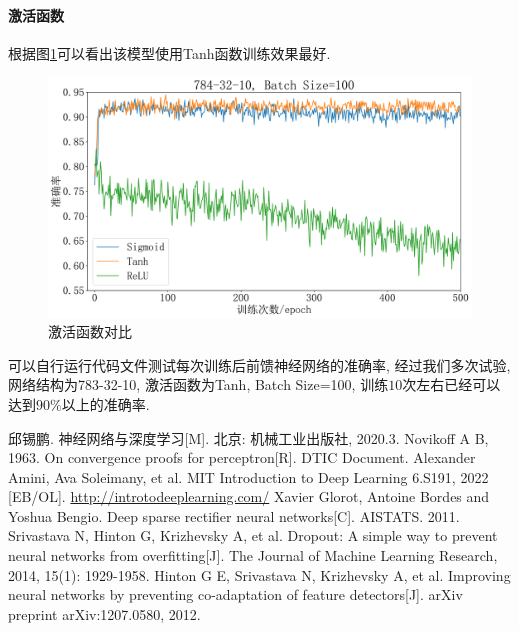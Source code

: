 \documentclass[12pt, a4paper, oneside]{ctexart}
\begin{document}
\paragraph{激活函数}
根据图\ref{figure-diff_activation}可以看出该模型使用Tanh函数训练效果最好.
\begin{figure}[!h]
    \centering
    \includegraphics[scale=0.45]{diff_activation_function.pdf}
    \caption{激活函数对比}
    \label{figure-diff_activation}
\end{figure}

可以自行运行代码文件测试每次训练后前馈神经网络的准确率, 经过我们多次试验, 网络结构为783-32-10, 激活函数为Tanh, Batch Size=100, 训练$10$次左右已经可以达到$90\%$以上的准确率.

\clearpage
\begin{thebibliography}{99}  
邱锡鹏. 神经网络与深度学习[M]. 北京: 机械工业出版社, 2020.3.
Novikoff A B, 1963. On convergence proofs for perceptron[R]. DTIC Document.
Alexander Amini, Ava Soleimany, et al. MIT Introduction to Deep Learning 6.S191, 2022 [EB/OL]. \url{http://introtodeeplearning.com/}
Xavier Glorot, Antoine Bordes and Yoshua Bengio. Deep sparse rectifier neural networks[C]. AISTATS. 2011.
Srivastava N, Hinton G, Krizhevsky A, et al. Dropout: A simple way to prevent neural networks from overfitting[J]. The Journal of Machine Learning Research, 2014, 15(1): 1929-1958.
Hinton G E, Srivastava N, Krizhevsky A, et al. Improving neural networks by preventing co-adaptation of feature detectors[J]. arXiv preprint arXiv:1207.0580, 2012.
\end{thebibliography}
\end{document}
